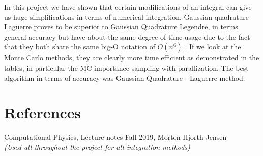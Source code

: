 \documentclass{article}
\begin{document}
In this project we have shown that certain modifications of an integral can give us huge simplifications in terms of numerical integration. Gaussian quadrature Laguerre proves to be superior to Gaussian Quadrature Legendre, in terms general accuracy but have about the same degree of time-usage due to the fact that they both share the same big-O notation of $O(n^6)$ .  
If we look at the Monte Carlo methods, they are clearly more time efficient as demonstrated in the tables, in particular the MC importance sampling with parallization. The best algorithm in terms of accuracy was Gaussian Quadrature - Laguerre method. 

\section{References}
Computational Physics, Lecture notes Fall 2019, Morten Hjorth-Jensen \\ \textit{(Used all throughout the project for all integration-methods)}

\end{document}
